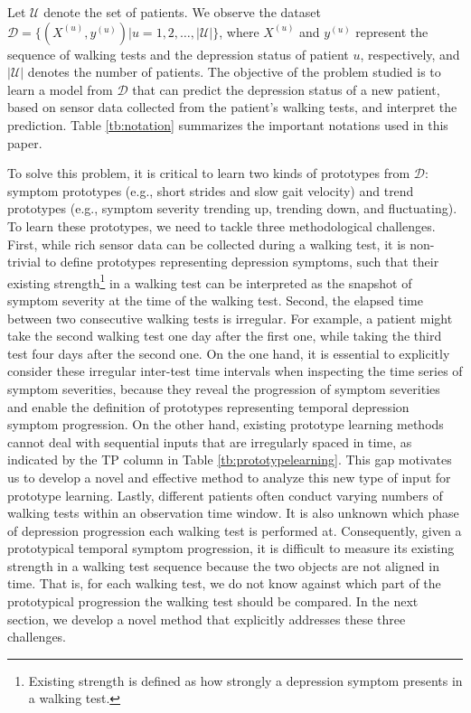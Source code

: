 \documentclass[mnsc]{informs3b} %
\begin{document}
Let $\mathcal{U}$ denote the set of patients. We observe the dataset $\mathcal{D}=\{(X^{(u)},y^{(u)} )|u=1,2,\dots,|\mathcal{U}| \}$, where $X^{(u)}$ and $y^{(u)}$ represent the sequence of walking tests and the depression status of patient $u$, respectively, and $|\mathcal{U}|$ denotes the number of patients. The objective of the problem studied is to learn a model from $\mathcal{D}$ that can predict the depression status of a new patient, based on sensor data collected from the patient's walking tests, and interpret the prediction. Table \ref{tb:notation} summarizes the important notations used in this paper.

To solve this problem, it is critical to learn two kinds of prototypes from $\mathcal{D}$: symptom prototypes (e.g., short strides and slow gait velocity) and trend prototypes (e.g., symptom severity trending up, trending down, and fluctuating). To learn these prototypes, we need to tackle three methodological challenges. First, while rich sensor data can be collected during a walking test, it is non-trivial to define prototypes representing depression symptoms, such that their existing strength\footnote{Existing strength is defined as how strongly a depression symptom presents in a walking test.} in a walking test can be interpreted as the snapshot of symptom severity at the time of the walking test. 
Second, the elapsed time between two consecutive walking tests is irregular. For example, a patient might take the second walking test one day after the first one, while taking the third test four days after the second one. 
On the one hand, it is essential to explicitly consider these irregular inter-test time intervals when inspecting the time series of symptom severities, because they reveal the progression of symptom severities and enable the definition of prototypes representing temporal depression symptom progression.
On the other hand, existing prototype learning methods cannot deal with sequential inputs that are irregularly spaced in time, as indicated by the TP column in Table \ref{tb:prototypelearning}. This gap motivates us to develop a novel and effective method to analyze this new type of input for prototype learning.
Lastly, different patients often conduct varying numbers of walking tests within an observation time window. It is also unknown which phase of depression progression each walking test is performed at. 
Consequently, given a prototypical temporal symptom progression, it is difficult to measure its existing strength in a walking test sequence because the two objects are not aligned in time. That is, for each walking test, we do not know against which part of the prototypical progression the walking test should be compared. 
In the next section, we develop a novel method that explicitly addresses these three challenges.
\end{document}
